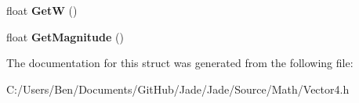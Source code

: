 \begin{DoxyCompactItemize}
\item 
\hypertarget{struct_jade_1_1_math_1_1_vector4_a9ad4cd3b5dffb8aeb428ba26287c589c}{}float {\bfseries Get\+W} ()\label{struct_jade_1_1_math_1_1_vector4_a9ad4cd3b5dffb8aeb428ba26287c589c}

\item 
\hypertarget{struct_jade_1_1_math_1_1_vector4_aef10cbee168bb99e46a7d4ba3543b620}{}float {\bfseries Get\+Magnitude} ()\label{struct_jade_1_1_math_1_1_vector4_aef10cbee168bb99e46a7d4ba3543b620}

\end{DoxyCompactItemize}


The documentation for this struct was generated from the following file\+:\begin{DoxyCompactItemize}
\item 
C\+:/\+Users/\+Ben/\+Documents/\+Git\+Hub/\+Jade/\+Jade/\+Source/\+Math/Vector4.\+h\end{DoxyCompactItemize}

